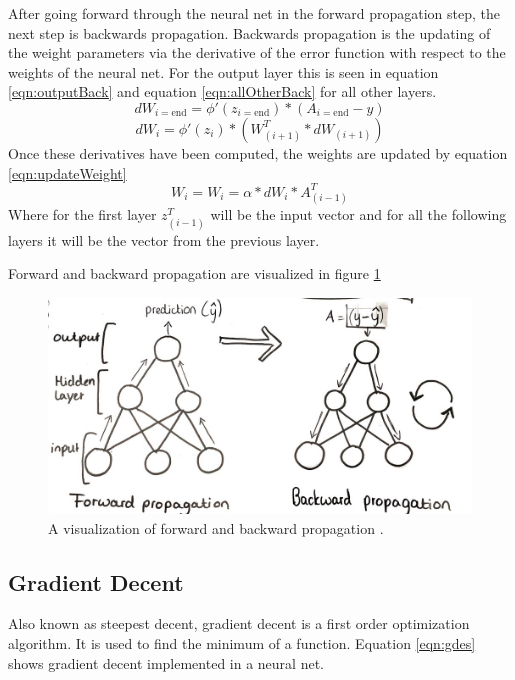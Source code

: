 \documentclass[12pt]{article}
\begin{document}
	After going forward through the neural net in the forward propagation step, the next step is backwards propagation. Backwards propagation is the updating of the weight parameters via the derivative of the error function with respect to the weights of the neural net. For the output layer this is seen in equation \ref{eqn:outputBack} and equation \ref{eqn:allOtherBack} for all other layers.
	\begin{equation}
	dW_{i=\text{end}}=\phi'(z_{i=\text{end}})*\left(A_{i=\text{end}}-y\right)
	\label{eqn:outputBack}
	\end{equation}
	\begin{equation}
	dW_i=\phi'(z_i)*\left(W_{\left(i+1\right)}^T*dW_{\left(i+1\right)}\right)
	\label{eqn:allOtherBack}
	\end{equation}
	Once these derivatives have been computed, the weights are updated by equation \ref{eqn:updateWeight}
	\begin{equation}
	W_i = W_i=\alpha*dW_{i}*A_{\left(i-1\right)}^T
	\label{eqn:updateWeight}
	\end{equation}
	Where for the first layer $z_{\left(i-1\right)}^T$ will be the input vector and for all the following layers it will be the vector from the previous layer. \par 
	
	Forward and backward propagation are visualized in figure \ref{fig:forwardbackwardprop}
	
	\begin{figure}
		\centering
		\includegraphics[width=0.7\linewidth]{forwardBackwardProp}
		\caption{A visualization of forward and backward propagation \cite{nnBlog}.}
		\label{fig:forwardbackwardprop}
	\end{figure}
	\subsection{Gradient Decent}
	Also known as steepest decent, gradient decent is a first order optimization algorithm. It is used to find the minimum of a function. Equation \ref{eqn:gdes} shows gradient decent implemented in a neural net. 
	
\end{document}
